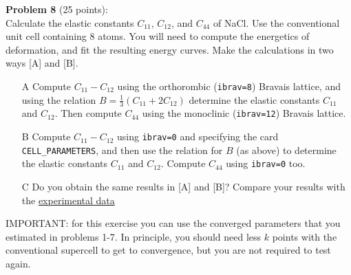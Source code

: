 \documentclass[12pt]{article}
\begin{document}

  \noindent
  {\bf Problem 8} (25 points):\\

  \noindent
  Calculate the elastic constants $C_{11}$, $C_{12}$, and $C_{44}$ of NaCl. Use the conventional unit cell containing 8 atoms. 
  You will need to compute the energetics of deformation, and fit the resulting energy curves. Make the calculations in two ways [A] and [B].

  \begin{itemize}

    \item[A]
    Compute $C_{11}-C_{12}$ using the orthorombic ({\tt ibrav=8}) Bravais lattice, and using the relation $B = \frac{1}{3} (C_{11} + 2 C_{12})$ determine the elastic constants $C_{11}$ and $C_{12}$. Then compute $C_{44}$ using the monoclinic ({\tt ibrav=12}) Bravais lattice.

    \item[B]
    Compute $C_{11}-C_{12}$ using {\tt ibrav=0} and specifying the card {\tt CELL\_PARAMETERS}, and then use the relation for $B$ (as above) to determine the elastic constants $C_{11}$ and $C_{12}$. Compute $C_{44}$ using {\tt ibrav=0} too.

    \item[C]
    Do you obtain the same results in [A] and [B]? Compare your results with the \href{https://doi.org/10.1016/S0022-3697(72)80468-2}{experimental data} 


  \end{itemize}
  IMPORTANT: for this exercise you can use the converged parameters that you estimated in problems 1-7. In principle, you should need less $k$ points with the conventional supercell to get to convergence, but 
  you are not required to test again.
\end{document}

